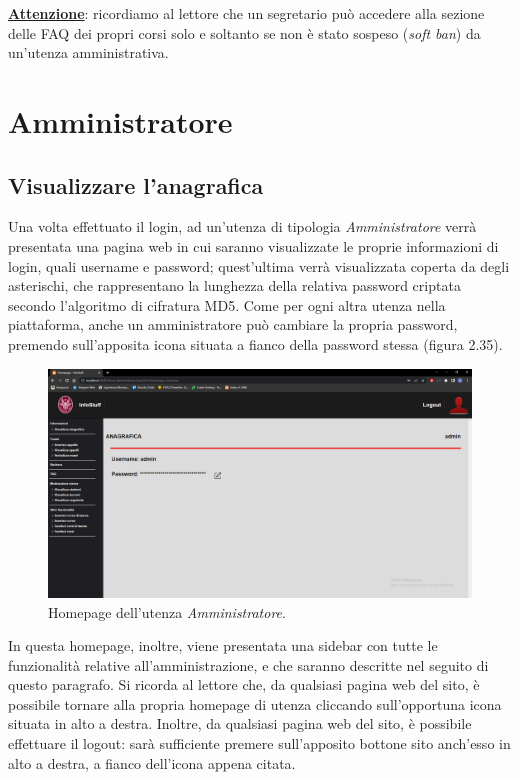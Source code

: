 \documentclass [a4paper,11pt]{book}
\begin{document}
\medskip

\textbf{\underline{Attenzione}}: ricordiamo al lettore che un segretario può accedere alla sezione delle FAQ dei propri corsi solo e soltanto se non è stato sospeso (\emph{soft ban}) da un'utenza amministrativa.

\medskip
\medskip

\section{Amministratore}

\subsection{Visualizzare l'anagrafica}

Una volta effettuato il login, ad un'utenza di tipologia \emph{Amministratore} verrà presentata una pagina web in cui saranno visualizzate le proprie informazioni di login, quali username e password; quest'ultima verrà visualizzata coperta da degli asterischi, che rappresentano la lunghezza della relativa password criptata secondo l'algoritmo di cifratura MD5. Come per ogni altra utenza nella piattaforma, anche un amministratore può cambiare la propria password, premendo sull'apposita icona situata a fianco della password stessa (figura 2.35). 

\begin{figure}
\centering
\includegraphics[scale=0.3]{figura2-35.png}
\caption{Homepage dell'utenza \emph{Amministratore}.}
\end{figure}

In questa homepage, inoltre, viene presentata una sidebar con tutte le funzionalità relative all'amministrazione, e che saranno descritte nel seguito di questo paragrafo. Si ricorda al lettore che, da qualsiasi pagina web del sito, è possibile tornare alla propria homepage di utenza cliccando sull'opportuna icona situata in alto a destra. Inoltre, da qualsiasi pagina web del sito, è possibile effettuare il logout: sarà sufficiente premere sull'apposito bottone sito anch'esso in alto a destra, a fianco dell'icona appena citata.
\end{document}
